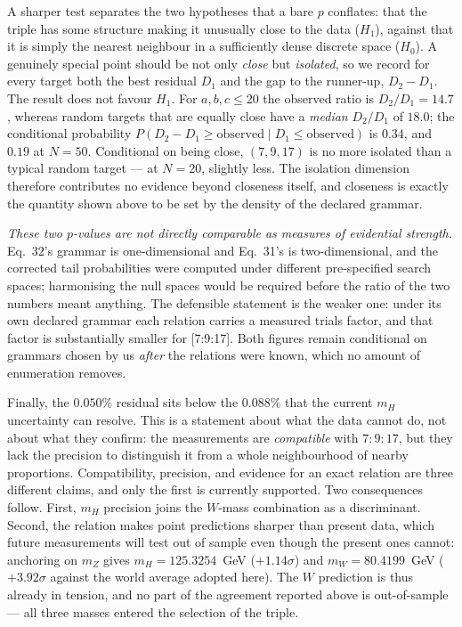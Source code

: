 \documentclass[twocolumn,prd,amsmath,amssymb,floatfix]{revtex4-2}
\begin{document}
A sharper test separates the two hypotheses that a bare $p$ conflates: that the
triple has some structure making it unusually close to the data ($H_1$), against
that it is simply the nearest neighbour in a sufficiently dense discrete space
($H_0$).  A genuinely special point should be not only \emph{close} but
\emph{isolated}, so we record for every target both the best residual $D_1$ and
the gap to the runner-up, $D_2-D_1$.  The result does not favour $H_1$.  For
$a,b,c\le 20$ the observed ratio is $D_2/D_1 = 14.7$, whereas random targets
that are equally close have a \emph{median} $D_2/D_1$ of $18.0$; the conditional
probability $P(D_2-D_1 \ge \text{observed} \mid D_1 \le \text{observed})$ is
$0.34$, and $0.19$ at $N=50$.  Conditional on being close, $(7,9,17)$ is no more
isolated than a typical random target --- at $N=20$, slightly less.  The
isolation dimension therefore contributes no evidence beyond closeness itself,
and closeness is exactly the quantity shown above to be set by the density of
the declared grammar.

\emph{These two $p$-values are not directly comparable as measures of evidential
strength.}  Eq.~32's grammar is one-dimensional and Eq.~31's is
two-dimensional, and the corrected tail probabilities were computed under
different pre-specified search spaces; harmonising the null spaces would be
required before the ratio of the two numbers meant anything.  The defensible
statement is the weaker one: under its own declared grammar each relation
carries a measured trials factor, and that factor is substantially smaller for
[7:9:17].  Both figures remain conditional on grammars chosen by us
\emph{after} the relations were known, which no amount of enumeration removes.

Finally, the $0.050\%$ residual sits below the $0.088\%$ that the current $m_H$
uncertainty can resolve.  This is a statement about what the data cannot do, not
about what they confirm: the measurements are \emph{compatible} with $7:9:17$,
but they lack the precision to distinguish it from a whole neighbourhood of
nearby proportions.  Compatibility, precision, and evidence for an exact
relation are three different claims, and only the first is currently supported.
Two consequences follow.  First, $m_H$ precision joins the $W$-mass combination
as a discriminant.  Second, the relation makes point predictions sharper than
present data, which future measurements will test out of sample even though the
present ones cannot: anchoring on $m_Z$ gives $m_H = 125.3254$~GeV
($+1.14\sigma$) and $m_W = 80.4199$~GeV ($+3.92\sigma$ against the world average
adopted here).  The $W$ prediction is thus already in tension, and no part of
the agreement reported above is out-of-sample --- all three masses entered the
selection of the triple.
\end{document}
